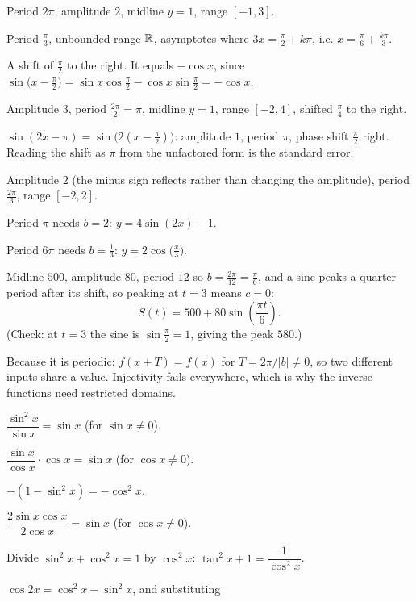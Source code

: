 \begin{solutions}
  \item Period $2\pi$, amplitude $2$, midline $y=1$, range $[-1,3]$.
  \item Period $\tfrac{\pi}{3}$, unbounded range $\mathbb{R}$, asymptotes where
        $3x=\tfrac{\pi}{2}+k\pi$, i.e. $x=\tfrac{\pi}{6}+\tfrac{k\pi}{3}$.
  \item A shift of $\tfrac{\pi}{2}$ to the right. It equals $-\cos x$,
        since $\sin\bigl(x-\tfrac{\pi}{2}\bigr)
        =\sin x\cos\tfrac{\pi}{2}-\cos x\sin\tfrac{\pi}{2}=-\cos x$.
  \item Amplitude $3$, period $\tfrac{2\pi}{2}=\pi$, midline $y=1$, range
        $[-2,4]$, shifted $\tfrac{\pi}{4}$ to the right.
  \item $\sin(2x-\pi)=\sin\bigl(2(x-\tfrac{\pi}{2})\bigr)$: amplitude $1$,
        period $\pi$, phase shift $\tfrac{\pi}{2}$ right. Reading the
        shift as $\pi$ from the unfactored form is the standard error.
  \item Amplitude $2$ (the minus sign reflects rather than changing the
        amplitude), period $\tfrac{2\pi}{3}$, range $[-2,2]$.
  \item Period $\pi$ needs $b=2$: $y=4\sin(2x)-1$.
  \item Period $6\pi$ needs $b=\tfrac13$:
        $y=2\cos\bigl(\tfrac{x}{3}\bigr)$.
  \item Midline $500$, amplitude $80$, period $12$ so
        $b=\tfrac{2\pi}{12}=\tfrac{\pi}{6}$, and a sine peaks a quarter
        period after its shift, so peaking at $t=3$ means $c=0$:
        \[
          S(t)=500+80\sin\!\left(\frac{\pi t}{6}\right).
        \]
        (Check: at $t=3$ the sine is $\sin\tfrac{\pi}{2}=1$, giving the
        peak $580$.)
  \item Because it is periodic: $f(x+T)=f(x)$ for $T=2\pi/|b|\neq0$, so two
        different inputs share a value. Injectivity fails everywhere, which
        is why the inverse functions need restricted domains.
  \item $\dfrac{\sin^{2}x}{\sin x}=\sin x$ (for $\sin x\neq0$).
  \item $\dfrac{\sin x}{\cos x}\cdot\cos x=\sin x$ (for
        $\cos x\neq0$).
  \item $-(1-\sin^{2}x)=-\cos^{2}x$.
  \item $\dfrac{2\sin x\cos x}{2\cos x}=\sin x$ (for $\cos x\neq0$).
  \item Divide $\sin^{2}x+\cos^{2}x=1$ by $\cos^{2}x$:
        $\tan^{2}x+1=\dfrac{1}{\cos^{2}x}$.
  \item $\cos2x=\cos^{2}x-\sin^{2}x$, and substituting

\end{solutions}
